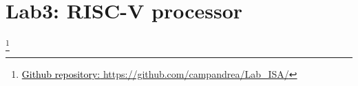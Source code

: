 



\chapter{Lab3: RISC-V processor}
{\let\thefootnote\relax\footnote{{\href{https://github.com/campandrea/Lab_ISA/}{\textcolor{black}{Github repository:} https://github.com/campandrea/Lab\_ISA/}}}}


